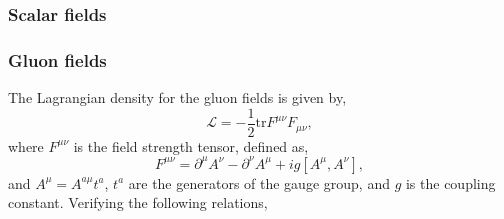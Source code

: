 \documentclass[11pt,a4paper,twoside,pdf]{article}
\numberwithin{equation}{section}
\begin{document}

\subsubsection{Scalar fields}

\subsubsection{Gluon fields}

The Lagrangian density for the gluon fields is given by,
\begin{equation}
    \mathcal{L} = -\frac{1}{2}\text{tr}F^{\mu\nu}F_{\mu\nu},
\end{equation}
where $F^{\mu\nu}$ is the field strength tensor, defined as,
\begin{equation}
    F^{\mu\nu} = \partial^\mu A^\nu - \partial^\nu A^\mu + ig [A^\mu, A^\nu],
\end{equation}
and $A^\mu = A^{a\mu}t^a$, $t^a$ are the generators of the gauge group, and $g$ is the
coupling constant. Verifying the following relations,
\end{document}

